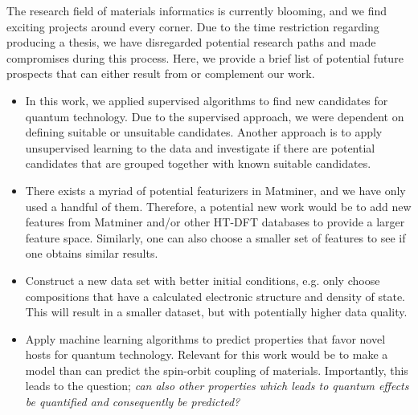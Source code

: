 The research field of materials informatics is currently blooming, and we find exciting projects around every corner.
Due to the time restriction regarding producing a thesis, we have  disregarded potential research paths and made compromises during this process. Here, we provide a brief list of potential future prospects that can either result from or complement our work.
\begin{itemize}
  \item In this work, we applied supervised algorithms to find new candidates for quantum technology. Due to the supervised approach, we were dependent on defining suitable or unsuitable candidates. Another approach is to apply unsupervised learning to the data and investigate if there are potential candidates that are grouped together with known suitable candidates.
  \item There exists a myriad of potential featurizers in Matminer, and we have only used a handful of them. Therefore, a potential new work would be to add new features from Matminer and/or other HT-DFT databases to provide a larger feature space. Similarly, one can also choose a smaller set of features to see if one obtains similar results.
  \item Construct a new data set with better initial conditions, e.g. only choose compositions that have a calculated electronic structure and density of state. This will result in a smaller dataset, but with potentially higher data quality.
  \item Apply machine learning algorithms to predict properties that favor novel hosts for quantum technology. Relevant for this work would be to make a model than can predict the spin-orbit coupling of materials. Importantly, this leads to the question; \textit{can also other properties which leads to quantum effects be quantified and consequently be predicted?}
\end{itemize}


